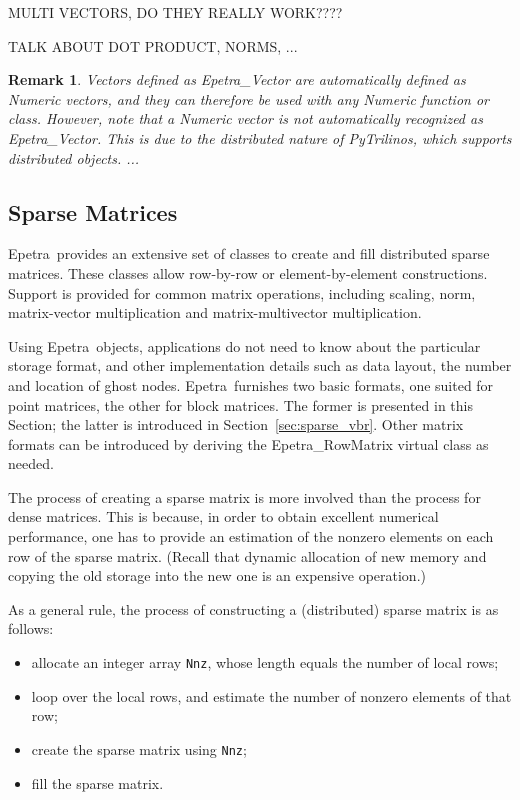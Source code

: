 \documentclass[10pt,relax]{SANDreport}
\newcommand{\PyTrilinos}{{PyTrilinos}}
\newcommand{\epetra}{{Epetra}}
\newtheorem{remark}{Remark}
\begin{document}
MULTI VECTORS, DO THEY REALLY WORK????

TALK ABOUT DOT PRODUCT, NORMS, ...

\begin{remark}
Vectors defined as Epetra\_Vector are automatically defined as Numeric
vectors, and they can therefore be used with any Numeric function or class.
However, note that a Numeric vector is {\sl not} automatically recognized as
Epetra\_Vector. This is due to the distributed nature of \PyTrilinos, which
supports distributed objects. ...
\end{remark}

\subsection{Sparse Matrices}
\label{sec:matrices}

\epetra\ provides an extensive set of classes to create and fill
distributed sparse matrices. These classes allow row-by-row or
element-by-element constructions. Support is provided for common matrix
operations, including scaling, norm, matrix-vector multiplication and
matrix-multivector multiplication.

Using \epetra\ objects, applications do not need to know about the
particular storage format, and other implementation details such as data
layout, the number and location of ghost nodes. \epetra\ furnishes two
basic formats, one suited for point matrices, the other for block
matrices.  The former is presented in this Section; the latter is
introduced in Section~\ref{sec:sparse_vbr}. Other matrix formats can be
introduced by deriving the Epetra\_RowMatrix virtual class as needed.

The process of creating a sparse matrix is more involved than the
process for dense matrices. This is because, in order to obtain
excellent numerical performance, one has to provide an estimation of
the nonzero elements on each row of the sparse matrix. (Recall that
dynamic allocation of new memory and copying the old storage into the
new one is an expensive operation.)

As a general rule, the process of constructing a (distributed) sparse
matrix is as follows:
\begin{itemize}
\item allocate an integer array \verb!Nnz!, whose length equals the
  number of local rows;
\item loop over the local rows, and estimate the number of nonzero
  elements of that row;
\item create the sparse matrix using \verb!Nnz!;
\item fill the sparse matrix.
\end{itemize}
\end{document}
